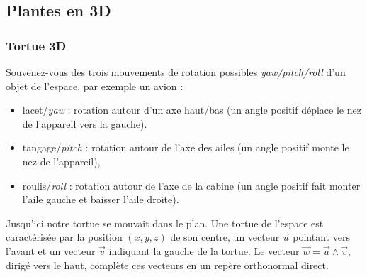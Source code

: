 \documentclass[11pt,class=report,crop=false]{standalone}
\begin{document}
\subsection{Plantes en 3D}

\subsubsection*{Tortue 3D}


Souvenez-vous des trois mouvements de rotation possibles \emph{yaw/pitch/roll} d'un objet de l'espace, par exemple un avion :
\begin{itemize}
  \item lacet/\emph{yaw} : rotation autour d'un axe haut/bas (un angle positif déplace le nez de l'appareil vers la gauche).	
  \item tangage/\emph{pitch} : rotation autour de l'axe des ailes (un angle positif monte le nez de l'appareil),
  \item roulis/\emph{roll} : rotation autour de l'axe de la cabine (un angle positif fait monter l'aile gauche et baisser l'aile droite).
\end{itemize}




Jusqu'ici notre tortue se mouvait dans le plan.
Une tortue de l'espace est caractérisée par la position $(x,y,z)$ de son centre, un vecteur $\vec{u}$ pointant vers l'avant et un vecteur $\vec{v}$ indiquant la gauche de la tortue.
Le vecteur $\vec{w} = \vec{u} \wedge \vec{v}$, dirigé vers le haut, complète ces vecteurs en un repère orthonormal direct.

\end{document}
